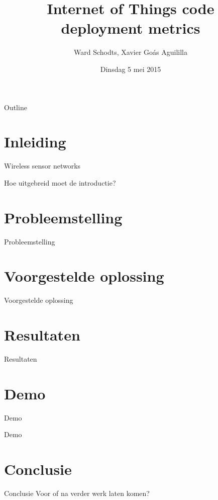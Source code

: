 \documentclass[presentation, bigger]{beamer}
\author{Ward Schodts, Xavier Goás Aguililla}
\date{Dinsdag 5 mei 2015}
\title{Internet of Things code deployment metrics}
\begin{document}
\maketitle
\begin{frame}[noframenumbering]{Outline}
  \tableofcontents
\end{frame}



\section{Inleiding}
\begin{frame}{Wireless sensor networks}

Hoe uitgebreid moet de introductie?
\end{frame}


\section{Probleemstelling}
\begin{frame}{Probleemstelling}

\end{frame}

\section{Voorgestelde oplossing}

\begin{frame}{Voorgestelde oplossing}

\end{frame}

\section{Resultaten}
\begin{frame}{Resultaten}

\end{frame}

\section{Demo}
\begin{frame}{Demo}
\begin{center}
\Huge{Demo}
\end{center}
\end{frame}

\section{Conclusie}
\begin{frame}{Conclusie}
Voor of na verder werk laten komen?
\end{frame}
\end{document}
